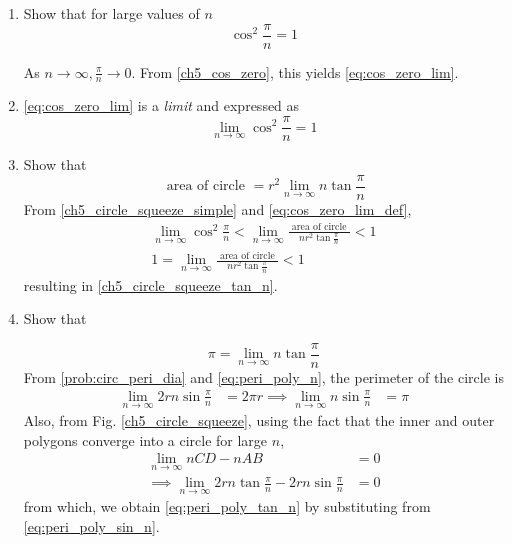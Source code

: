 \begin{enumerate}[label=\arabic*.,ref=\thesubsection.\theenumi]
%
\item
	Show that for large values of $n$
	\begin{equation}
\label{eq:cos_zero_lim}
\cos^2\frac{\pi}{n} = 1
%
	\end{equation}	

%
\solution  As $n \to \infty, \frac{\pi}{n} \to 0$. From \eqref{ch5_cos_zero}, this yields \eqref{eq:cos_zero_lim}.

%
\item  \eqref{eq:cos_zero_lim} is a {\em limit} and 
	 expressed as 
%
\begin{equation}
\label{eq:cos_zero_lim_def}
\lim_{n \rightarrow \infty}\cos^2\frac{\pi}{n} = 1
\end{equation}
%	

\item
	Show that 
\begin{equation}
\label{ch5_circle_squeeze_tan_n}
\text{ area of circle } = r^2\lim_{n \rightarrow \infty}
{n\tan\frac{\pi}{n}} 
\end{equation}	
\solution From \eqref{ch5_circle_squeeze_simple} and \eqref{eq:cos_zero_lim_def}, 
	\begin{align}
\lim_{n\to \infty}\cos^2\frac{\pi}{n} < \lim_{n\to \infty} \frac{\text{ area of circle }}{nr^{2}\tan\frac{\pi}{n}} < 1	
\\
1 = \lim_{n\to \infty} \frac{\text{ area of circle }}{nr^{2}\tan\frac{\pi}{n}} < 1	
\end{align}
resulting in \eqref{ch5_circle_squeeze_tan_n}.
%

%
\item Show that 

	\begin{equation}
\label{eq:peri_poly_tan_n}
	\pi = \lim_{n \rightarrow \infty}
	{n\tan\frac{\pi}{n}}
	\end{equation}
\solution From \eqref{prob:circ_peri_dia} and \eqref{eq:peri_poly_n}, the perimeter of the circle is 
%
\begin{align}
\label{eq:peri_poly_sin_n}
\lim_{n\to \infty}2rn \sin\frac{\pi}{n} &= 2\pi r
\implies \lim_{n\to \infty}n \sin\frac{\pi}{n} &= \pi 
\end{align}
%
Also, from Fig. \eqref{ch5_circle_squeeze}, using the fact that the inner and outer polygons converge into a circle for large $n$,
\begin{align}
\lim_{n\to \infty} nCD -nAB &= 0
\\
\implies \lim_{n\to \infty} 2r n\tan\frac{\pi}{n}-2r n\sin\frac{\pi}{n} &= 0
\end{align}
%
from which, we obtain \eqref{eq:peri_poly_tan_n}
by substituting from \eqref{eq:peri_poly_sin_n}.



\end{enumerate}
